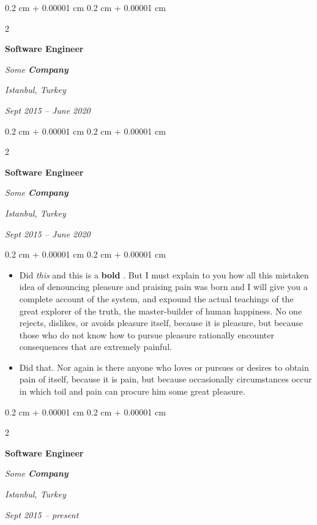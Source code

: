 \documentclass[10pt, letterpaper]{article}
\newenvironment{highlights}{
    \begin{itemize}[
        topsep=0.10 cm,
        parsep=0.10 cm,
        partopsep=0pt,
        itemsep=0pt,
        leftmargin=0.4 cm + 10pt
    ]
}{
    \end{itemize}
} %
\newenvironment{onecolentry}{
    \begin{adjustwidth}{
        0.2 cm + 0.00001 cm
    }{
        0.2 cm + 0.00001 cm
    }
}{
    \end{adjustwidth}
} %
\newenvironment{twocolentry}[2][]{
    \onecolentry
    \def\secondColumn{#2}
    \setcolumnwidth{\fill, 4.5 cm}
    \begin{paracol}{2}
}{
    \switchcolumn \raggedleft \secondColumn
    \end{paracol}
    \endonecolentry
} %
\let\hrefWithoutArrow\href
\renewcommand{\href}[2]{\hrefWithoutArrow{#1}{\ifthenelse{\equal{#2}{}}{ }{#2 }\raisebox{.15ex}{\footnotesize \faExternalLink*}}}
\begin{document}
        \vspace{0.2 cm}

        \begin{twocolentry}{
        \textit{Istanbul, Turkey}    
            
        \textit{Sept 2015 – June 2020}}
            \textbf{Software Engineer}
            
            \textit{Some \textbf{Company}}
        \end{twocolentry}



        \vspace{0.2 cm}

        \begin{twocolentry}{
        \textit{Istanbul, Turkey}    
            
        \textit{Sept 2015 – June 2020}}
            \textbf{Software Engineer}
            
            \textit{Some \textbf{Company}}
        \end{twocolentry}

        \vspace{0.10 cm}
        \begin{onecolentry}
            \begin{highlights}
                \item Did \textit{this} and this is a \textbf{bold} \href{https://example.com}{link}. But I must explain to you how all this mistaken idea of denouncing pleasure and praising pain was born and I will give you a complete account of the system, and expound the actual teachings of the great explorer of the truth, the master-builder of human happiness. No one rejects, dislikes, or avoids pleasure itself, because it is pleasure, but because those who do not know how to pursue pleasure rationally encounter consequences that are extremely painful.
                \item Did that. Nor again is there anyone who loves or pursues or desires to obtain pain of itself, because it is pain, but because occasionally circumstances occur in which toil and pain can procure him some great pleasure.
            \end{highlights}
        \end{onecolentry}


        \vspace{0.2 cm}

        \begin{twocolentry}{
        \textit{Istanbul, Turkey}    
            
        \textit{Sept 2015 – present}}
            \textbf{Software Engineer}
            
            \textit{Some \textbf{Company}}
        \end{twocolentry}
\end{document}
